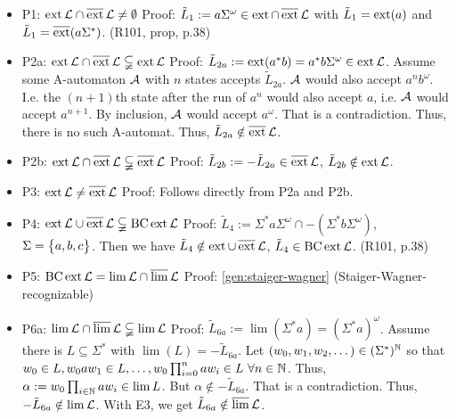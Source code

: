 \label{P:reg-star}
\begin{itemize}
\item P1: $\operatorname{ext} \mathcal{L} \cap \operatorname{\overline{ext}} \mathcal{L} \neq \emptyset$ \newline
Proof: $\tilde{L}_1 := a \Sigma^\omega \in \operatorname{ext} \cap \operatorname{\overline{ext}} \mathcal{L}$ with $\tilde{L}_1 = \operatorname{ext}(a)$ and $\tilde{L}_1 = \operatorname{\overline{ext}} (a \Sigma^*)$. (R101, prop, p.38)
\item P2a: $\operatorname{ext} \mathcal{L} \cap \operatorname{\overline{ext}} \mathcal{L} \subsetneqq \operatorname{ext} \mathcal{L}$ \newline
Proof: $\tilde{L}_{2a} := \operatorname{ext}(a^* b) = a^* b \Sigma^\omega \in \operatorname{ext} \mathcal{L}$. Assume some A-automaton $\mathcal{A}$ with $n$ states accepts $\tilde{L}_{2a}$. $\mathcal{A}$ would also accept $a^n b^\omega$. I.e. the $(n+1)$th state after the run of $a^n$ would also accept $a$, i.e. $\mathcal{A}$ would accept $a^{n+1}$. By inclusion, $\mathcal{A}$ would accept $a^\omega$. That is a contradiction. Thus, there is no such A-automat. Thus, $\tilde{L}_{2a} \notin \operatorname{\overline{ext}} \mathcal{L}$.
\item P2b: $\operatorname{ext} \mathcal{L} \cap \operatorname{\overline{ext}} \mathcal{L} \subsetneqq \operatorname{\overline{ext}} \mathcal{L}$ \newline
Proof: $\tilde{L}_{2b} := - \tilde{L}_{2a} \in \operatorname{\overline{ext}} \mathcal{L}$, $\tilde{L}_{2b} \notin \operatorname{ext} \mathcal{L}$.
\item P3: $\operatorname{ext} \mathcal{L} \neq \operatorname{\overline{ext}} \mathcal{L}$ \newline
Proof: Follows directly from P2a and P2b.
\item P4: $\operatorname{ext} \mathcal{L} \cup \operatorname{\overline{ext}} \mathcal{L} \subsetneqq \operatorname{BC} \operatorname{ext} \mathcal{L}$ \newline
Proof: $\tilde{L}_4 := \Sigma^* a \Sigma^\omega \cap -(\Sigma^* b \Sigma^\omega)$, $\Sigma = \Set{a,b,c}$. Then we have $\tilde{L}_4 \notin \operatorname{ext} \cup \operatorname{\overline{ext}} \mathcal{L}$, $\tilde{L}_4 \in \operatorname{BC} \operatorname{ext} \mathcal{L}$. (R101, p.38)
\item P5: $\operatorname{BC} \operatorname{ext} \mathcal{L} = \lim \mathcal{L} \cap \operatorname{\overline{lim}} \mathcal{L}$ \newline
Proof: \ref{gen:staiger-wagner} (Staiger-Wagner-recognizable)
\item P6a: $\lim \mathcal{L} \cap \operatorname{\overline{lim}} \mathcal{L} \subsetneqq \lim \mathcal{L}$ \newline
Proof: $\tilde{L}_{6a} := \lim(\Sigma^* a) = (\Sigma^* a)^\omega$. Assume there is $L \subseteq \Sigma^*$ with $\lim(L) = -\tilde{L}_{6a}$. Let $(w_0,w_1,w_2,\dotsc) \in (\Sigma^*)^{\mathbb{N}}$ so that $w_0 \in L, w_0 a w_1 \in L, \dotsc, w_0 \prod_{i=0}^n a w_i \in L \ \forall n \in \mathbb{N}$. Thus, $\alpha := w_0 \prod_{i \in \mathbb{N}} a w_i \in \lim L$. But $\alpha \notin -\tilde{L}_{6a}$. That is a contradiction. Thus, $-\tilde{L}_{6a} \notin \lim \mathcal{L}$. With E3, we get $\tilde{L}_{6a} \notin \operatorname{\overline{lim}} \mathcal{L}$.

\end{itemize}
